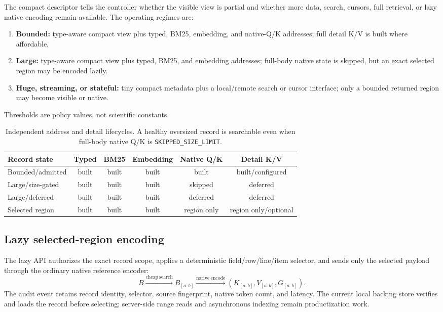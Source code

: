 \documentclass[11pt]{article}
\begin{document}
The compact descriptor tells the controller whether the visible view is
partial and whether more data, search, cursors, full retrieval, or lazy native
encoding remain available. The operating regimes are:
\begin{enumerate}[leftmargin=*]
  \item \textbf{Bounded:} type-aware compact view plus typed, BM25, embedding,
  and native-Q/K addresses; full detail K/V is built where affordable.
  \item \textbf{Large:} type-aware compact view plus typed, BM25, and embedding
  addresses; full-body native state is skipped, but an exact selected region
  may be encoded lazily.
  \item \textbf{Huge, streaming, or stateful:} tiny compact metadata plus a
  local/remote search or cursor interface; only a bounded returned region may
  become visible or native.
\end{enumerate}
Thresholds are policy values, not scientific constants.

\begin{table}[t]
\centering
\small
\begin{tabular}{@{}lccccc@{}}
\toprule
Record state & Typed & BM25 & Embedding & Native Q/K & Detail K/V\\
\midrule
Bounded/admitted & built & built & built & built & built/configured\\
Large/size-gated & built & built & built & skipped & deferred\\
Large/deferred & built & built & built & deferred & deferred\\
Selected region & built & built & built & region only & region only/optional\\
\bottomrule
\end{tabular}
\caption{Independent address and detail lifecycles. A healthy oversized record
is searchable even when full-body native Q/K is
\texttt{SKIPPED\_SIZE\_LIMIT}.}
\label{tab:independent-lifecycle}
\end{table}

\subsection{Lazy selected-region encoding}

The lazy API authorizes the exact record scope, applies a deterministic
field/row/line/item selector, and sends only the selected payload through the
ordinary native reference encoder:
\[
B \xrightarrow{\mathrm{cheap\ search}} B_{[a:b]}
\xrightarrow{\mathrm{native\ encode}} (K_{[a:b]},V_{[a:b]},G_{[a:b]}).
\]
The audit event retains record identity, selector, source fingerprint, native
token count, and latency. The current local backing store verifies and loads
the record before selecting; server-side range reads and asynchronous indexing
remain productization work.
\end{document}

